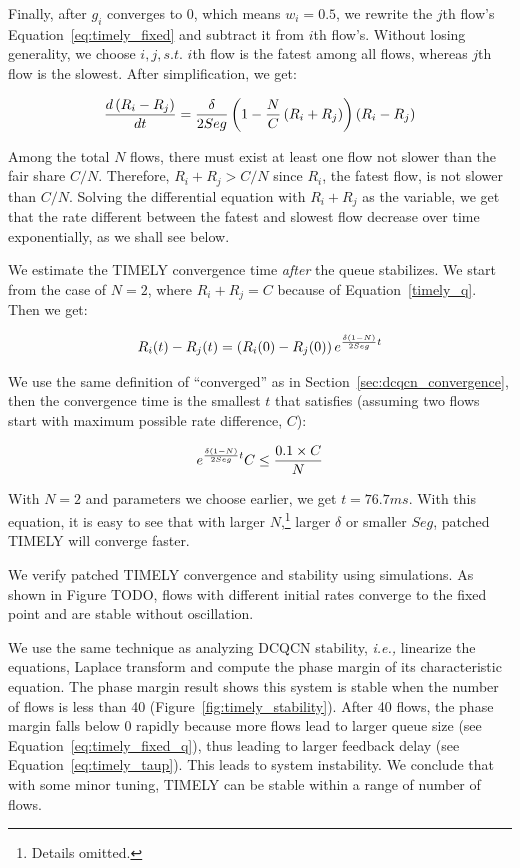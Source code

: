 Finally, after $g_i$ converges to 0, which means $w_i=0.5$, we rewrite the $j$th flow's Equation~\ref{eq:timely_fixed} 
and subtract it from $i$th flow's. Without losing generality, we choose $i,j, s.t.$ $i$th flow is the fatest among all flows,
whereas $j$th flow is the slowest. After simplification, we get:

\begin{equation}
\small
\frac{{d\left( {{R_i} - {R_j}} \right)}}{{dt}} = \frac{\delta }{{2Seg}}\left( {1 - \frac{N}{C}\left( {{R_i} + {R_j}} \right)} \right)\left( {{R_i} - {R_j}} \right)
\end{equation}

Among the total $N$ flows, there must exist at least one flow not slower than the fair share $C/N$.
Therefore, ${{R_i} + {R_j}} > C/N$ since $R_i$, the fatest flow, is not slower than $C/N$.
Solving the differential equation with ${{R_i} + {R_j}}$ as the variable, we get that the rate 
different between the fatest and slowest flow decrease over time exponentially, as we shall see below. 

 We estimate the TIMELY convergence time {\em after}
the queue stabilizes. We start from the case of $N=2$, where $R_i + R_j = C$ because of Equation~\ref{timely_q}.
Then we get:

\begin{equation}
\small
{R_i}(t) - {R_j}(t) = \left( {{R_i}(0) - {R_j}(0)} \right){e^{\frac{{\delta (1 - N)}}{{2Seg}}t}}
\end{equation}

We use the same definition of ``converged'' as in Section~\ref{sec:dcqcn_convergence}, then the convergence
time is the smallest $t$ that satisfies (assuming two flows start with maximum possible rate difference, $C$):

\begin{equation}
\small
{e^{\frac{{\delta (1 - N)}}{{2Seg}}t}}C \le \frac{{0.1 \times C}}{N}
\end{equation}

With $N=2$ and parameters we choose earlier, we get $t = 76.7ms$. With this equation, it is easy to see that
with larger $N$,\footnote{Details omitted.} larger $\delta$ or smaller $Seg$, patched TIMELY will converge faster.

We verify patched TIMELY convergence and stability using simulations. As shown in Figure TODO, flows with different 
initial rates converge to the fixed point and are stable without oscillation. 

 We use the same technique as analyzing
DCQCN stability, {\em i.e.,} linearize the equations, Laplace transform and compute the phase margin 
of its characteristic equation. The phase margin result shows this system is stable when the number of 
flows is less than 40 (Figure~\ref{fig:timely_stability}). After 40 flows, the phase margin falls below 
0 rapidly because more flows lead to larger queue size (see Equation~\ref{eq:timely_fixed_q}), 
thus leading to larger feedback delay (see Equation~\ref{eq:timely_taup}). 
This leads to system instability. We conclude that with some minor tuning, TIMELY can be stable 
within a range of number of flows.
